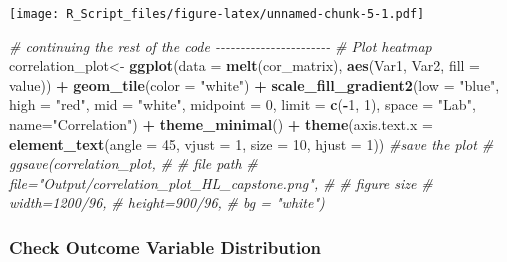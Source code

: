 \documentclass[
]{article}
\newenvironment{Shaded}{\begin{snugshade}}{\end{snugshade}}
\newcommand{\AttributeTok}[1]{\textcolor[rgb]{0.13,0.29,0.53}{#1}}
\newcommand{\CommentTok}[1]{\textcolor[rgb]{0.56,0.35,0.01}{\textit{#1}}}
\newcommand{\DecValTok}[1]{\textcolor[rgb]{0.00,0.00,0.81}{#1}}
\newcommand{\FunctionTok}[1]{\textcolor[rgb]{0.13,0.29,0.53}{\textbf{#1}}}
\newcommand{\NormalTok}[1]{#1}
\newcommand{\OtherTok}[1]{\textcolor[rgb]{0.56,0.35,0.01}{#1}}
\newcommand{\SpecialCharTok}[1]{\textcolor[rgb]{0.81,0.36,0.00}{\textbf{#1}}}
\newcommand{\StringTok}[1]{\textcolor[rgb]{0.31,0.60,0.02}{#1}}
\begin{document}
\texttt{[image: R\_Script\_files/figure-latex/unnamed-chunk-5-1.pdf]}

\begin{Shaded}
\begin{Highlighting}[]
\CommentTok{\# continuing the rest of the code {-}{-}{-}{-}{-}{-}{-}{-}{-}{-}{-}{-}{-}{-}{-}{-}{-}{-}{-}{-}{-}{-}{-}}
\CommentTok{\# Plot heatmap}
\NormalTok{correlation\_plot}\OtherTok{\textless{}{-}} \FunctionTok{ggplot}\NormalTok{(}\AttributeTok{data =} \FunctionTok{melt}\NormalTok{(cor\_matrix), }\FunctionTok{aes}\NormalTok{(Var1, Var2, }\AttributeTok{fill =}\NormalTok{ value)) }\SpecialCharTok{+}
  \FunctionTok{geom\_tile}\NormalTok{(}\AttributeTok{color =} \StringTok{"white"}\NormalTok{) }\SpecialCharTok{+}
  \FunctionTok{scale\_fill\_gradient2}\NormalTok{(}\AttributeTok{low =} \StringTok{"blue"}\NormalTok{, }\AttributeTok{high =} \StringTok{"red"}\NormalTok{, }\AttributeTok{mid =} \StringTok{"white"}\NormalTok{, }
                       \AttributeTok{midpoint =} \DecValTok{0}\NormalTok{, }\AttributeTok{limit =} \FunctionTok{c}\NormalTok{(}\SpecialCharTok{{-}}\DecValTok{1}\NormalTok{, }\DecValTok{1}\NormalTok{), }\AttributeTok{space =} \StringTok{"Lab"}\NormalTok{,}
                       \AttributeTok{name=}\StringTok{"Correlation"}\NormalTok{) }\SpecialCharTok{+}
  \FunctionTok{theme\_minimal}\NormalTok{() }\SpecialCharTok{+}
  \FunctionTok{theme}\NormalTok{(}\AttributeTok{axis.text.x =} \FunctionTok{element\_text}\NormalTok{(}\AttributeTok{angle =} \DecValTok{45}\NormalTok{, }\AttributeTok{vjust =} \DecValTok{1}\NormalTok{, }
                                   \AttributeTok{size =} \DecValTok{10}\NormalTok{, }\AttributeTok{hjust =} \DecValTok{1}\NormalTok{))}
\CommentTok{\#save the plot}
\CommentTok{\# ggsave(correlation\_plot,}
\CommentTok{\#        \# file path}
\CommentTok{\#        file="Output/correlation\_plot\_HL\_capstone.png",}
\CommentTok{\#        \# figure size}
\CommentTok{\#        width=1200/96,}
\CommentTok{\#        height=900/96,}
\CommentTok{\#        bg = "white")}
\end{Highlighting}
\end{Shaded}

\hypertarget{check-outcome-variable-distribution}{%
\subsubsection{Check Outcome Variable
Distribution}\label{check-outcome-variable-distribution}}

\begin{Shaded}
\end{Shaded}
\end{document}

